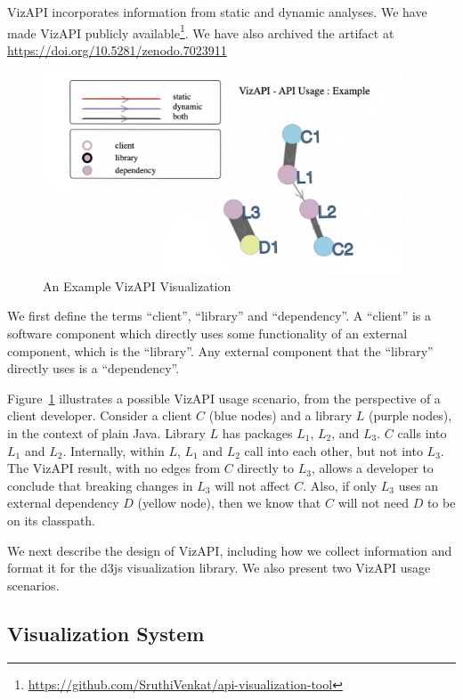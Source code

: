 VizAPI incorporates information from static and dynamic analyses. 
We have made VizAPI publicly available\footnote{\url{https://github.com/SruthiVenkat/api-visualization-tool}}. We have also archived the artifact at \href{https://doi.org/10.5281/zenodo.7023911}{https://doi.org/10.5281/zenodo.7023911}

\begin{figure}[h]
\begin{center}
\includegraphics[height=6cm]{images/intro-example.png}
\caption{An Example VizAPI Visualization}
\label{fig:example}
\end{center}
\end{figure}

We first define the terms ``client'', ``library'' and ``dependency''. A ``client'' is a software component which directly uses some functionality of an external component, which is the ``library''. Any external component that the ``library'' directly uses is a ``dependency''. 

Figure~\ref{fig:example} illustrates a possible VizAPI usage scenario, from the perspective of a client developer. Consider a client $C$ (blue nodes) and a library $L$ (purple nodes), in the context of plain Java. Library $L$ has packages $L_1$, $L_2$, and $L_3$. $C$ calls into $L_1$ and $L_2$. Internally, within $L$, $L_1$ and $L_2$ call into each other, but not into $L_3$. The VizAPI result, with no edges from $C$ directly to $L_3$, allows a developer to conclude that breaking changes in $L_3$ will not affect $C$. Also, if only $L_3$ uses an external dependency $D$ (yellow node), then we know that $C$ will not need $D$ to be on its classpath.


We next describe the design of VizAPI, including how we
collect information and format it for the d3js visualization
library. We also present two VizAPI usage scenarios.

\subsection{Visualization System}
\label{subsec:vis-system}

